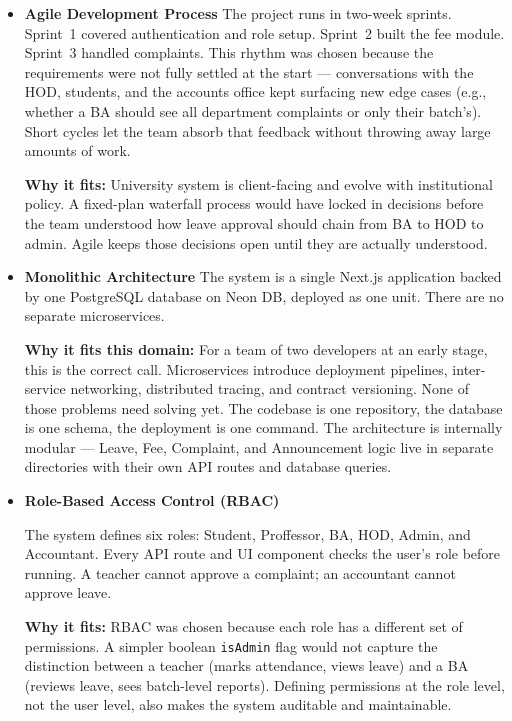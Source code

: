 \begin{itemize}
    \item \textbf{Agile Development Process}
The project runs in two-week sprints. Sprint~1 covered authentication and role setup.
Sprint~2 built the fee module. Sprint~3 handled complaints. This rhythm was chosen
because the requirements were not fully settled at the start — conversations with the
HOD, students, and the accounts office kept surfacing new edge cases (e.g., whether a
BA should see all department complaints or only their batch's). Short cycles
let the team absorb that feedback without throwing away large amounts of work.

\textbf{Why it fits:} University system is client-facing and evolve
with institutional policy. A fixed-plan waterfall process would have locked in
decisions before the team understood how leave approval should chain from BA to
HOD to admin. Agile keeps those decisions open until they are actually understood.

    \item \textbf{Monolithic Architecture}
The system is a single Next.js application backed by one PostgreSQL database on Neon
DB, deployed as one unit. There are no separate microservices.

\textbf{Why it fits this domain:} For a team of two developers at an early stage, this is the correct call. Microservices introduce deployment pipelines, inter-service networking, distributed tracing, and contract versioning. None of those problems need solving yet. The codebase is one repository, the database is one schema, the deployment is one command. The architecture is internally modular — Leave, Fee, Complaint, and Announcement logic live in separate directories with their own API routes and database queries.

    \item \textbf{Role-Based Access Control (RBAC)}

    The system defines six roles: Student, Proffessor, BA, HOD, Admin, and Accountant. Every API route and UI component checks the user's
role before running. A teacher cannot approve a complaint; an accountant cannot
approve leave.

\textbf{Why it fits:} RBAC was chosen because each role has a different set of permissions. A simpler boolean \texttt{isAdmin} flag would not capture the distinction between a
teacher (marks attendance, views leave) and a BA (reviews leave, sees batch-level reports). Defining permissions at the role level, not the user level, also makes the system auditable and maintainable.\


\end{itemize}
